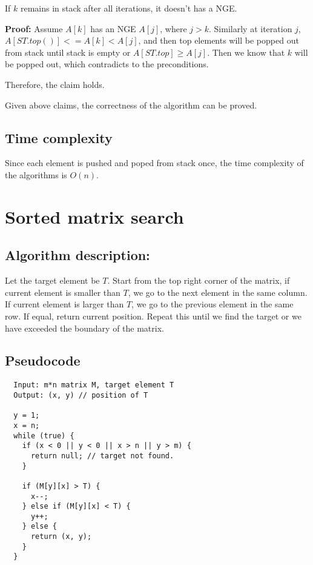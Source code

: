 \documentclass[paper=a4, fontsize=11pt]{scrartcl} %
\numberwithin{equation}{section} %
\numberwithin{figure}{section} %
\numberwithin{table}{section} %
\newcounter{claimcounter}
\numberwithin{claimcounter}{section}
\newenvironment{claim}{\stepcounter{claimcounter}{\textbf{Claim \theclaimcounter:}}}{}
\begin{document}
\begin{claim}
  If $k$ remains in stack after all iterations, it doesn't has a NGE. 
\end{claim}

\textbf{Proof:}
Assume $A[k]$ has an NGE $A[j]$, where $j > k$. Similarly at iteration $j$,
$A[ST.top()] <= A[k] < A[j]$, and then top elements will be popped 
out from stack until stack is empty or $A[ST.top] \geq A[j]$. Then we know that
$k$ will be popped out, which contradicts to the preconditions.

Therefore, the claim holds.

\vspace{0.5cm}
Given above claims, the correctness of the algorithm can be proved.

\subsection*{Time complexity}
Since each element is pushed and poped from stack once, the time complexity of
the algorithms is $O(n)$.


\section{Sorted matrix search}
\subsection*{Algorithm description:}
Let the target element be $T$.
Start from the top right corner of the matrix, if current element is smaller
than $T$, we go to the next element in the same column. If current element is 
larger than $T$, we go to the previous element in the same row. If equal, return
current position. Repeat this until we find the target or we have exceeded the
boundary of the matrix.

\subsection*{Pseudocode}
\begin{verbatim}
  Input: m*n matrix M, target element T
  Output: (x, y) // position of T

  y = 1;
  x = n;
  while (true) {
    if (x < 0 || y < 0 || x > n || y > m) {
      return null; // target not found.
    }

    if (M[y][x] > T) {
      x--;
    } else if (M[y][x] < T) {
      y++;
    } else {
      return (x, y);
    }
  }
\end{verbatim}
\end{document}
